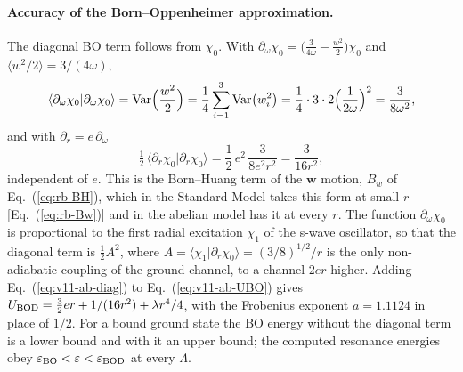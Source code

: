 \paragraph{Accuracy of the Born--Oppenheimer approximation.}
The diagonal BO term follows from $\chi_0$.
With $\partial_\omega\chi_0=\bigl(\frac{3}{4\omega}-\frac{w^2}{2}\bigr)\chi_0$ and $\langle w^2/2\rangle=3/(4\omega)$,
\begin{equation}
\langle\partial_\omega\chi_0|\partial_\omega\chi_0\rangle={\rm Var}\Bigl(\frac{w^2}{2}\Bigr)=\frac14\sum_{i=1}^3{\rm Var}\bigl(w_i^2\bigr)=\frac14\cdot3\cdot2\Bigl(\frac{1}{2\omega}\Bigr)^2=\frac{3}{8\omega^2},
\label{eq:v11-ab-var}
\end{equation}
and with $\partial_r=e\,\partial_\omega$
\begin{equation}
\tfrac12\,\langle\partial_r\chi_0|\partial_r\chi_0\rangle=\frac12\,e^2\,\frac{3}{8e^2r^2}=\frac{3}{16r^2},
\label{eq:v11-ab-diag}
\end{equation}
independent of $e$.
This is the Born--Huang term of the $\bm w$ motion, $B_w$ of Eq.~(\ref{eq:rb-BH}), which in the Standard Model takes this form at small $r$ [Eq.~(\ref{eq:rb-Bw})] and in the abelian model has it at every $r$.
The function $\partial_\omega\chi_0$ is proportional to the first radial excitation $\chi_1$ of the s-wave oscillator, so that the diagonal term is $\frac12A^2$, where $A=\langle\chi_1|\partial_r\chi_0\rangle=(3/8)^{1/2}/r$ is the only non-adiabatic coupling of the ground channel, to a channel $2er$ higher.
Adding Eq.~(\ref{eq:v11-ab-diag}) to Eq.~(\ref{eq:v11-ab-UBO}) gives $U_{\rm BOD}=\frac32er+1/(16r^2)+\lambda r^4/4$, with the Frobenius exponent $a=1.1124$ in place of $1/2$. %
For a bound ground state the BO energy without the diagonal term is a lower bound and with it an upper bound; the computed resonance energies obey $\varepsilon_{\rm BO}<\varepsilon<\varepsilon_{\rm BOD}$ at every $\Lambda$. %

